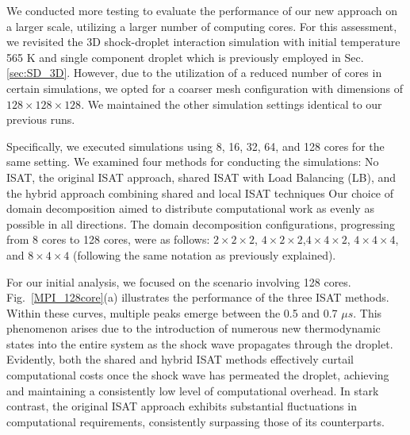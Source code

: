 

We conducted more testing to evaluate the performance of our new approach on a larger scale, utilizing a larger number of computing cores. For this assessment, we revisited the 3D shock-droplet interaction simulation with initial temperature 565 K and single component  droplet which is previously employed in Sec.\ref{sec:SD_3D}. However, due to the utilization of a reduced number of cores in certain simulations, we opted for a coarser mesh configuration with dimensions of $128\times128\times128$.  We maintained the other simulation settings identical to our previous runs.

Specifically, we executed simulations using 8, 16, 32, 64, and 128 cores for the same setting. We examined four methods for conducting the simulations: No ISAT, the original ISAT approach, shared ISAT with Load Balancing (LB), and the hybrid approach combining shared and local ISAT techniques Our choice of domain decomposition aimed to distribute computational work as evenly as possible in all directions. The domain decomposition configurations, progressing from 8 cores to 128 cores, were as follows: $2\times2\times2$, $4\times2\times2$,$ 4\times4\times2$, $4\times4\times4$, and $8\times4\times4$ (following the same notation as previously explained).

For our initial analysis, we focused on the scenario involving 128 cores. Fig.~\ref{MPI_128core}(a) illustrates the performance of the three ISAT methods. Within these curves, multiple peaks emerge between the 0.5 and 0.7 $\mu s$. This phenomenon arises due to the introduction of numerous new thermodynamic states into the entire system as the shock wave propagates through the droplet. Evidently, both the shared and hybrid ISAT methods effectively curtail computational costs once the shock wave has permeated the droplet, achieving and maintaining a consistently low level of computational overhead. In stark contrast, the original ISAT approach exhibits substantial fluctuations in computational requirements, consistently surpassing those of its counterparts.

